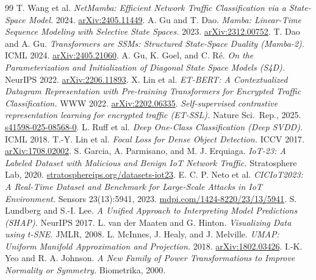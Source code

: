 \documentclass[11pt,a4paper]{article}
\begin{document}
\small
\begin{thebibliography}{99}
 T. Wang et al. \emph{NetMamba: Efficient Network Traffic Classification via a State-Space Model.} 2024. \href{https://arxiv.org/abs/2405.11449}{arXiv:2405.11449}.
 A. Gu and T. Dao. \emph{Mamba: Linear-Time Sequence Modeling with Selective State Spaces.} 2023. \href{https://arxiv.org/abs/2312.00752}{arXiv:2312.00752}.
 T. Dao and A. Gu. \emph{Transformers are SSMs: Structured State-Space Duality (Mamba-2).} ICML 2024. \href{https://arxiv.org/abs/2405.21060}{arXiv:2405.21060}.
 A. Gu, K. Goel, and C. R\'e. \emph{On the Parameterization and Initialization of Diagonal State Space Models (S4D).} NeurIPS 2022. \href{https://arxiv.org/abs/2206.11893}{arXiv:2206.11893}.
 X. Lin et al. \emph{ET-BERT: A Contextualized Datagram Representation with Pre-training Transformers for Encrypted Traffic Classification.} WWW 2022. \href{https://arxiv.org/abs/2202.06335}{arXiv:2202.06335}.
 \emph{Self-supervised contrastive representation learning for encrypted traffic (ET-SSL).} Nature Sci.\ Rep., 2025. \href{https://www.nature.com/articles/s41598-025-08568-0}{s41598-025-08568-0}.
 L. Ruff et al. \emph{Deep One-Class Classification (Deep SVDD).} ICML 2018.
 T.-Y. Lin et al. \emph{Focal Loss for Dense Object Detection.} ICCV 2017. \href{https://arxiv.org/abs/1708.02002}{arXiv:1708.02002}.
 S. Garcia, A. Parmisano, and M. J. Erquiaga. \emph{IoT-23: A Labeled Dataset with Malicious and Benign IoT Network Traffic.} Stratosphere Lab, 2020. \href{https://www.stratosphereips.org/datasets-iot23}{stratosphereips.org/datasets-iot23}.
 E. C. P. Neto et al. \emph{CICIoT2023: A Real-Time Dataset and Benchmark for Large-Scale Attacks in IoT Environment.} Sensors 23(13):5941, 2023. \href{https://www.mdpi.com/1424-8220/23/13/5941}{mdpi.com/1424-8220/23/13/5941}.
 S. Lundberg and S.-I. Lee. \emph{A Unified Approach to Interpreting Model Predictions (SHAP).} NeurIPS 2017.
 L. van der Maaten and G. Hinton. \emph{Visualizing Data using t-SNE.} JMLR, 2008.
 L. McInnes, J. Healy, and J. Melville. \emph{UMAP: Uniform Manifold Approximation and Projection.} 2018. \href{https://arxiv.org/abs/1802.03426}{arXiv:1802.03426}.
 I.-K. Yeo and R. A. Johnson. \emph{A New Family of Power Transformations to Improve Normality or Symmetry.} Biometrika, 2000.

\end{thebibliography}
\end{document}
